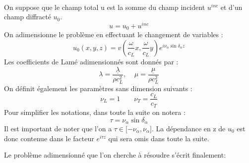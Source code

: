 \paragraph{}
On suppose que le champ total u est la somme du champ incident $u^{inc}$ et d'un champ diffracté $u_0$.
\begin{equation}
u=u_0+u^{inc}
\end{equation}
On adimensionne le problème en effectuant le changement de variables :
\begin{equation}
u_0(x,y,z)=v\left( \frac{\omega}{c_L} x, \frac{\omega}{c_L} y \right)e^{i\nu_{\alpha}\sin\delta_{\alpha}z}
\label{adiming}
\end{equation}
Les coefficients de Lamé adimensionnés sont donnés par :
$$ \lambda=\frac{\underline{\lambda}}{\rho c_L^2}, \; \; \; \; \mu=\frac{\underline{\mu}}{\rho c_L^2}$$
On définit également les paramètres sans dimension suivants :
\begin{equation}
\nu_L=1 \hspace{2em} \nu_T=\frac{c_L}{c_T} 
\end{equation}
Pour simplifier les notations, dans toute la suite on notera :
\begin{equation}
\tau=\nu_{\alpha}\sin\delta_{\alpha}
\label{deftau}
\end{equation}
Il est important de noter que l'on a $\tau \in \lbrack -\nu_{\alpha}, \nu_{\alpha} \rbrack$. La dépendance en z de $u_0$ est donc contenue dans le facteur $e^{i\tau z}$ qui sera omis dans toute la suite.

Le problème adimensionné que l'on cherche à résoudre s'écrit finalement:

